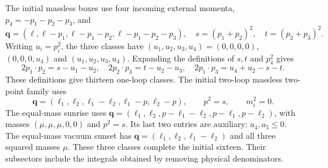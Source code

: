 The initial massless boxes use four incoming external momenta, $p_4=-p_1-p_2-p_3$, and
\begin{equation}
 \boldsymbol q=(\ell,\ell-p_1,\ell-p_1-p_2,\ell-p_1-p_2-p_3),
 \quad s=(p_1+p_2)^2,\quad t=(p_2+p_3)^2.
\end{equation}
Writing $u_i=p_i^2$, the three classes have $(u_1,u_2,u_3,u_4)=(0,0,0,0)$, $(0,0,0,u_4)$ and $(u_1,u_2,u_3,u_4)$. Expanding the definitions of $s,t$ and $p_4^2$ gives
\begin{equation}
 2p_1\cdot p_2=s-u_1-u_2,\quad
 2p_2\cdot p_3=t-u_2-u_3,\quad
 2p_1\cdot p_3=u_4+u_2-s-t.
\end{equation}
These definitions give thirteen one-loop classes. The initial two-loop massless two-point family uses
\begin{equation}
 \boldsymbol q=(\ell_1,\ell_2,\ell_1-\ell_2,\ell_1-p,\ell_2-p),
 \qquad p^2=s,\qquad m_i^2=0.
\end{equation}
The equal-mass sunrise uses $\boldsymbol q=(\ell_1,\ell_2,p-\ell_1-\ell_2,p-\ell_1,p-\ell_2)$, with masses $(\mu,\mu,\mu,0,0)$ and $p^2=s$. Its last two entries are auxiliary: $a_4,a_5\leq0$. The equal-mass vacuum sunset has $\boldsymbol q=(\ell_1,\ell_2,\ell_1-\ell_2)$ and all three squared masses $\mu$. These three classes complete the initial sixteen. Their subsectors include the integrals obtained by removing physical denominators.

